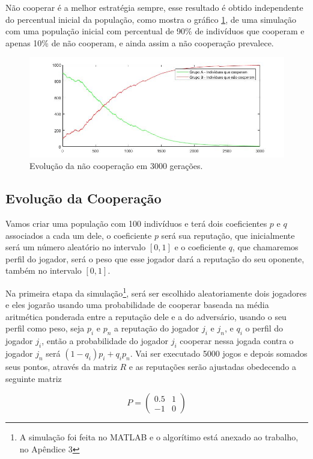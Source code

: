 Não cooperar é a melhor estratégia sempre, esse resultado é obtido independente do percentual inicial da população, como mostra o gráfico \ref{fig10}, de uma simulação com uma população inicial com percentual de 90\% de indivíduos que cooperam e apenas 10\% de não cooperam, e ainda assim a não cooperação prevalece.

\begin{figure}[H]
\centering
\includegraphics[width=14cm]{imagens/graf10.jpg}
\caption{Evolução da não cooperação em 3000 gerações.}
\label{fig10}
\end{figure}

\subsection{Evolução da Cooperação}

Vamos criar uma população com 100 indivíduos e terá dois coeficientes $p$ e $q$ associados a cada um dele, o coeficiente $p$ será sua reputação, que inicialmente será um número aleatório no intervalo $[0,1]$ e o coeficiente $q$, que chamaremos perfil do jogador, será o peso que esse jogador dará a reputação do seu oponente, também no intervalo $[0,1]$. 

Na primeira etapa da simulação\footnote{A simulação foi feita no MATLAB e o algorítimo está anexado ao trabalho, no Apêndice 3}, será ser escolhido aleatoriamente dois jogadores e eles jogarão usando uma probabilidade de cooperar baseada na média aritmética ponderada entre a reputação dele e a do adversário, usando o seu perfil como peso, seja $p_i$ e $p_n$ a reputação do jogador $j_i$ e $j_n$, e $q_i$ o perfil do jogador $j_i$, então a probabilidade do jogador $j_i$ cooperar nessa jogada contra o jogador $j_n$ será $(1-q_i)p_i+q_ip_n$. Vai ser executado 5000 jogos e depois somados seus pontos, através da matriz $R$ e as reputações serão ajustadas obedecendo a seguinte matriz

\begin{equation}\nonumber
P=\begin{pmatrix}
0.5 & 1\\-1 & 0
\end{pmatrix}
\end{equation}\vspace{0.1cm} 

